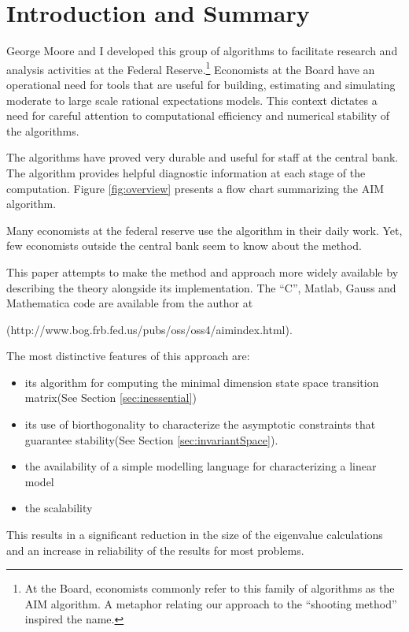 \documentclass{article}
\begin{document}
{





\pagestyle{fancy}
\rhead{\bfseries\thepage}{\bfseries\thepage}

\section{Introduction and Summary}
\label{sec:intro}

George Moore and I developed this group of algorithms to facilitate research and analysis activities   at the Federal 
Reserve.\footnote{ At the Board, economists commonly refer to this family of
algorithms as the 
AIM algorithm. A metaphor relating our approach to the ``shooting method'' 
inspired the name. }
Economists at the Board have an operational need for tools
that are useful for building, estimating and simulating moderate to large
scale rational 
expectations models.
This context dictates a need for careful 
attention to computational efficiency and
numerical stability of the algorithms.

The algorithms have proved very durable and useful for staff at the central bank.
The algorithm provides helpful diagnostic information at each stage of the computation.
Figure \ref{fig:overview} presents a flow chart  summarizing the AIM algorithm.

Many economists at the federal reserve use the algorithm in their daily 
work.\cite{bomfim96,persist,realrate,stab,zerobnd,fwlb,optpol,longrate,gmmml,learn,optsac,cr96,orphanides97,andrew98,orphanides98}
Yet, few  economists outside the central bank seem to know about the method.


This paper attempts to make the method and approach more widely 
available by describing the theory alongside its implementation.
The ``C'', Matlab, Gauss and Mathematica code are available from the author at


{\small
(http://www.bog.frb.fed.us/pubs/oss/oss4/aimindex.html).
}

The most distinctive features of this approach are:
\begin{itemize}
\item its algorithm for computing the minimal dimension state space 
transition matrix(See Section \ref{sec:inessential})
\item its
use of biorthogonality to characterize the asymptotic constraints 
that guarantee stability(See Section \ref{sec:invariantSpace}).
\item the availability of a simple modelling language for characterizing
a linear model
\item the scalability 
\end{itemize}
This results in a significant
reduction in the size of the eigenvalue calculations
and an increase in reliability of the results for most problems.

}
\end{document}
